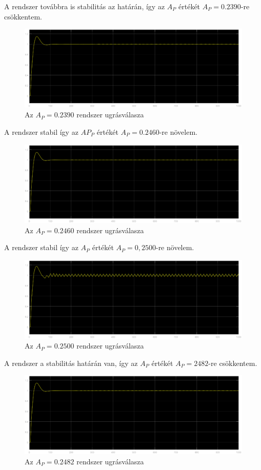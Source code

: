 \documentclass[12pt]{article}
\begin{document}
A rendszer továbbra is stabilitás az határán, így az $A_P$ értékét $A_P=0.2390$-re csökkentem.
\begin{figure}[H]
\centering
\includegraphics[scale=.50]{ap0239}
\caption{Az $A_P=0.2390$ rendszer ugrásválasza}
\end{figure}
A rendszer stabil így az $AP_P$ értékét $A_P=0.2460$-re növelem.
\begin{figure}[H]
\centering
\includegraphics[scale=.50]{ap0246}
\caption{Az $A_P=0.2460$ rendszer ugrásválasza}
\end{figure}
A rendszer stabil így az $A_P$ értékét $A_P=0,2500$-re növelem.
\begin{figure}[H]
\centering
\includegraphics[scale=.50]{ap02500}
\caption{Az $A_P=0.2500$ rendszer ugrásválasza}
\end{figure}
A rendszer a stabilitás határán van, így az $A_P$ értékét $A_P=2482$-re csökkentem.
\begin{figure}[H]
\centering
\includegraphics[scale=.50]{ap02482}
\caption{Az $A_P=0.2482$ rendszer ugrásválasza}
\end{figure}
\end{document}
